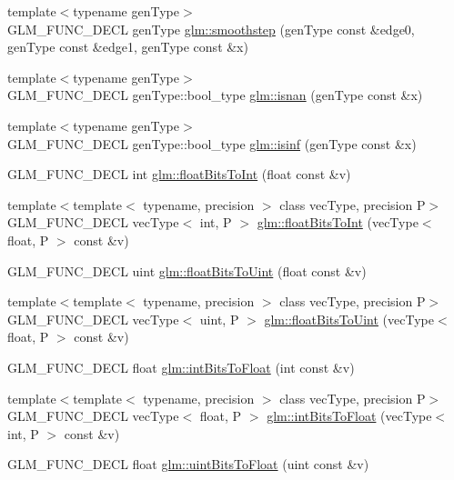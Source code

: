 \begin{CompactItemize}
\item 
{\footnotesize template$<$typename genType$>$ }\\GLM\_\-FUNC\_\-DECL genType \hyperlink{group__core__func__common_gcd449790122dcacf69b7e8a53f97fdd8}{glm::smoothstep} (genType const \&edge0, genType const \&edge1, genType const \&x)
\item 
{\footnotesize template$<$typename genType$>$ }\\GLM\_\-FUNC\_\-DECL genType::bool\_\-type \hyperlink{group__core__func__common_g64fb2e954341050194ba445111be01f7}{glm::isnan} (genType const \&x)
\item 
{\footnotesize template$<$typename genType$>$ }\\GLM\_\-FUNC\_\-DECL genType::bool\_\-type \hyperlink{group__core__func__common_g9ab92804679f33124bd9575da9ac6a3a}{glm::isinf} (genType const \&x)
\item 
GLM\_\-FUNC\_\-DECL int \hyperlink{group__core__func__common_gdc6a536a7bef046c3293d2ccad6d9ca2}{glm::floatBitsToInt} (float const \&v)
\item 
{\footnotesize template$<$template$<$ typename, precision $>$ class vecType, precision P$>$ }\\GLM\_\-FUNC\_\-DECL vecType$<$ int, P $>$ \hyperlink{group__core__func__common_gfddf54fe5089c73ff7216e1aa9f02620}{glm::floatBitsToInt} (vecType$<$ float, P $>$ const \&v)
\item 
GLM\_\-FUNC\_\-DECL uint \hyperlink{group__core__func__common_g748b4d2819b48d28ca09dc8733488873}{glm::floatBitsToUint} (float const \&v)
\item 
{\footnotesize template$<$template$<$ typename, precision $>$ class vecType, precision P$>$ }\\GLM\_\-FUNC\_\-DECL vecType$<$ uint, P $>$ \hyperlink{group__core__func__common_gd25f4b1449b40ee395b05552e98d103b}{glm::floatBitsToUint} (vecType$<$ float, P $>$ const \&v)
\item 
GLM\_\-FUNC\_\-DECL float \hyperlink{group__core__func__common_g2650dc57b2148a6ffbce20944fb4d97a}{glm::intBitsToFloat} (int const \&v)
\item 
{\footnotesize template$<$template$<$ typename, precision $>$ class vecType, precision P$>$ }\\GLM\_\-FUNC\_\-DECL vecType$<$ float, P $>$ \hyperlink{group__core__func__common_gb3619a03062573cb024a4deed71e21dc}{glm::intBitsToFloat} (vecType$<$ int, P $>$ const \&v)
\item 
GLM\_\-FUNC\_\-DECL float \hyperlink{group__core__func__common_g97464ca9ff4267de30ea408f700d4ca8}{glm::uintBitsToFloat} (uint const \&v)

\end{CompactItemize}
